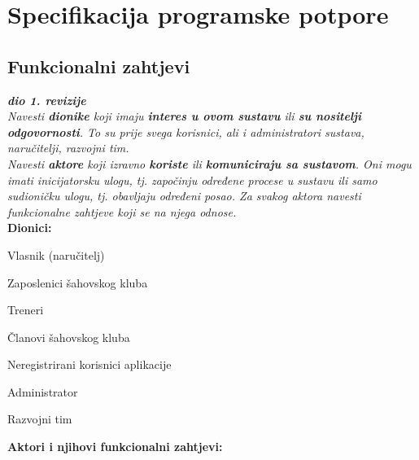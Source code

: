 \chapter{Specifikacija programske potpore}
		
	\section{Funkcionalni zahtjevi}
			
			\textbf{\textit{dio 1. revizije}}\\
			
			\textit{Navesti \textbf{dionike} koji imaju \textbf{interes u ovom sustavu} ili  \textbf{su nositelji odgovornosti}. To su prije svega korisnici, ali i administratori sustava, naručitelji, razvojni tim.}\\
				
			\textit{Navesti \textbf{aktore} koji izravno \textbf{koriste} ili \textbf{komuniciraju sa sustavom}. Oni mogu imati inicijatorsku ulogu, tj. započinju određene procese u sustavu ili samo sudioničku ulogu, tj. obavljaju određeni posao. Za svakog aktora navesti funkcionalne zahtjeve koji se na njega odnose.}\\
			
			
			\noindent \textbf{Dionici:}
			
			\begin{packed_enum}
				
				\item Vlasnik (naručitelj)				
				\item Zaposlenici šahovskog kluba
				\begin{packed_enum}
						
					\item Treneri
						
				\end{packed_enum}
				\item Članovi šahovskog kluba
				\item Neregistrirani korisnici aplikacije
				\item Administrator
				\item Razvojni tim
				
			\end{packed_enum}
			
			\noindent \textbf{Aktori i njihovi funkcionalni zahtjevi:}
			
